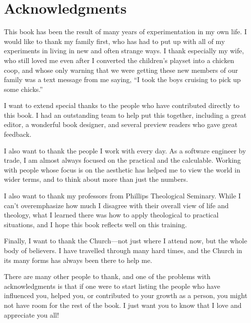 \chapter*{Acknowledgments}

This book has been the result of many years of experimentation in my own life.
I would like to thank my family first, who has had to put up with all of my 
experiments in living in new and often strange ways.  I thank especially my
wife, who still loved me even after I converted the children's playset into 
a chicken coop, and whose only warning that we were getting these new members
of our family was a text message from me saying,
``I took the boys cruising to pick up some chicks.''  

I want to extend special thanks to the people who have contributed directly
to this book.  I had an outstanding team to help put this together, including
a great editor, a wonderful book designer, and several preview readers who
gave great feedback.

I also want to thank the people I work with every day.  As a software engineer
by trade, I am almost always focused on the practical and the calculable.
Working with people whose focus is on the aesthetic has helped me to 
view the world in wider terms, and to think about more than just the numbers.

I also want to thank my professors from Phillips Theological Seminary.
While I can't overemphasize how much I disagree with their overall view of life
and theology, what I learned there was how to apply theological to
practical situations, and I hope this book reflects well on this training.  

Finally, I want to thank the Church---not just where I attend now, but the 
whole body of believers.  I have travelled through many hard times, and the
Church in its many forms has always been there to help me.

There are many other people to thank, and one of the problems with acknowledgments
is that if one were to start listing the people who have influenced you, helped you,
or contributed to your growth as a person, you might not have room for the rest
of the book.  I just want you to know that I love and appreciate you all!
